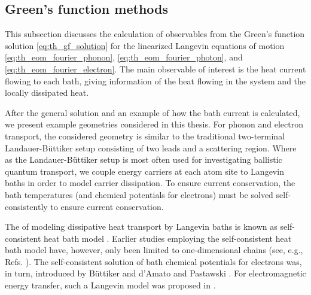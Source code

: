 

\subsection{Green's function methods}
\label{sec:methods_gf}

This subsection discusses the calculation of observables from the Green's function solution \eqref{eq:th_gf_solution} for the linearized Langevin equations of motion \eqref{eq:th_eom_fourier_phonon}, \eqref{eq:th_eom_fourier_photon}, and \eqref{eq:th_eom_fourier_electron}. The main observable of interest is the heat current flowing to each bath, giving information of the heat flowing in the system and the locally dissipated heat. 


After the general solution and an example of how the bath current is calculated, we present example geometries considered in this thesis. For phonon and electron transport, the considered geometry is similar to the traditional two-terminal Landauer-B\"uttiker setup \cite{buttiker92,datta} consisting of two leads and a scattering region. Where as the Landauer-B\"uttiker setup is most often used for investigating ballistic quantum transport, we couple energy carriers at each atom site to Langevin baths in order to model carrier dissipation. To ensure current conservation, the bath temperatures (and chemical potentials for electrons) must be solved self-consistently to ensure current conservation. 

The of modeling dissipative heat transport by Langevin baths is known as self-consistent heat bath model \cite{bolsterli70}. Earlier studies employing the self-consistent heat bath model have, however, only been limited to one-dimensional chains (see, e.g., Refs. \cite{dhar03,dhar06,segal09,bandyopadhyay11}). The self-consistent solution of bath chemical potentials for electrons was, in turn, introduced by B\"uttiker \cite{buttiker86} and d'Amato and Pastawski \cite{damato90}. For electromagnetic energy transfer, such a Langevin model was proposed in .

